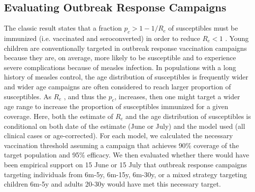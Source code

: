 \subsection{Evaluating Outbreak Response Campaigns}\label{ori}

The classic result states that a fraction \(p_c \gt 1-1/R_e\) of susceptibles must be immunized (i.e. vaccinated and seroconverted) in order to reduce \(R_e \lt 1\) \cite{Anderson_1981}. Young children are conventionally targeted in outbreak response vaccination campaigns because they are, on average, more likely to be susceptible and to experience severe complications because of measles infection. In populations with a long history of measles
control, the age distribution of susceptibles is frequently wider \cite{Ferrari_2013} and wider age campaigns are often considered to reach larger proportion of susceptibles. As \(R_e\) , and thus the \(p_c\), increases, then one might target a wider age range to increase the proportion of susceptibles immunized for a given coverage. Here, both the estimate of \(R_e\) and the age distribution of susceptibles is conditional on both date of the estimate (June or July) and the model used (all clinical cases or age-corrected). For each model, we calculated the necessary vaccination threshold assuming a campaign that achieves 90\% coverage of the target population and 95\% efficacy. We then evaluated whether there would have been empirical support on 15 June or 15 July that outbreak response campaigns targeting individuals from 6m-5y, 6m-15y, 6m-30y, or a mixed strategy targeting children 6m-5y and adults 20-30y would have met this necessary target.